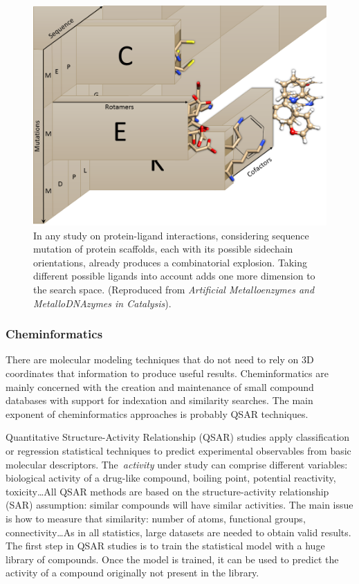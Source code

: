 \begin{figure}[H]
	\includegraphics[width=\textwidth]{./figures/02/chemical_space.png}
	\caption[Chemobiological spaces]{
		In any study on protein-ligand interactions, considering sequence mutation of protein scaffolds, each with its possible sidechain orientations, already produces a combinatorial explosion. Taking different possible ligands into account adds one more dimension to the search space. (Reproduced from \textit{Artificial Metalloenzymes and MetalloDNAzymes in Catalysis}\cite{wileybook}).
	}
	\label{fig:chemicalspace}
\end{figure}

\subsubsection{Cheminformatics}
There are molecular modeling techniques that do not need to rely on 3D coordinates that information to produce useful results. Cheminformatics are mainly concerned with the creation and maintenance of small compound databases with support for indexation and similarity searches. The main exponent of cheminformatics approaches is probably QSAR techniques.

Quantitative Structure-Activity Relationship (QSAR) studies apply classification or regression statistical techniques to predict experimental observables from basic molecular descriptors. The\ \textit{activity} under study can comprise different variables: biological activity of a drug-like compound, boiling point, potential reactivity, toxicity\ldots  All QSAR methods are based on the structure-activity relationship (SAR) assumption: similar compounds will have similar activities. The main issue is how to measure that similarity: number of atoms, functional groups, connectivity\ldots   As in all statistics, large datasets are needed to obtain valid results. The first step in QSAR studies is to train the statistical model with a huge library of compounds. Once the model is trained, it can be used to predict the activity of a compound originally not present in the library.

